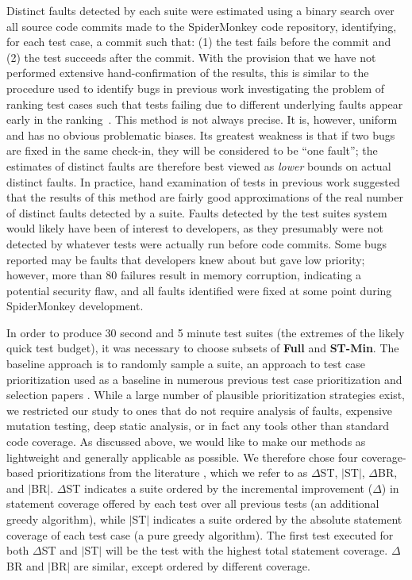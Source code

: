 Distinct faults detected by each suite were estimated using a binary
search over all source code commits made to the SpiderMonkey code
repository, identifying, for each test case, a commit such that: (1)
the test fails before the commit and (2) the test succeeds after the
commit.  With the provision that we have not performed extensive
hand-confirmation of the results, this is similar to the procedure
used to identify bugs in previous work investigating the problem of
ranking test cases such that tests failing due to different underlying
faults appear early in the ranking~\cite{PLDI13}.  This method is not
always precise. It is, however, uniform and has no obvious problematic
biases.  Its greatest weakness is that if two bugs are fixed in the
same check-in, they will be considered to be ``one fault''; the
estimates of distinct faults are therefore best viewed as \emph{lower}
bounds on actual distinct faults.  In practice, hand examination of
tests in previous work suggested that the results of this method are
fairly good approximations of the real number of distinct faults
detected by a suite.  Faults detected by the test suites system would
likely have been of interest to developers, as they presumably were not
detected by whatever tests were actually run before code commits.
Some bugs reported may be faults that developers knew about but gave
low priority; however, more than 80 failures result in memory
corruption, indicating a potential security flaw, and all faults
identified were fixed at some point during SpiderMonkey development.

In order to produce 30 second and 5 minute test suites (the extremes
of the likely quick test budget), it was necessary to choose subsets
of {\bf Full} and {\bf ST-Min}.  The baseline approach is to randomly
sample a suite, an approach to test case prioritization used as a
baseline in numerous previous test case prioritization and selection
papers \cite{YooHarman}.  While a large number of plausible
prioritization strategies exist, we restricted our study to ones that
do not require analysis of faults, expensive mutation testing, deep
static analysis, or in fact any tools other than standard code
coverage.  As discussed above, we would like to make our methods as
lightweight and generally applicable as possible.  We therefore chose
four coverage-based prioritizations from the literature
\cite{YooHarman,RothMin}, which we refer to as $\Delta$ST, $|$ST$|$,
$\Delta$BR, and $|$BR$|$.  $\Delta$ST indicates a suite ordered by the
incremental improvement ($\Delta$) in statement coverage offered by each test
over all previous tests (an additional greedy algorithm), while
$|$ST$|$ indicates a suite ordered by the absolute statement coverage
of each test case (a pure greedy algorithm).  The first test executed
for both $\Delta$ST and $|$ST$|$ will be the test with the highest
total statement coverage.  $\Delta$BR and $|$BR$|$ are similar, except
ordered by different coverage.

